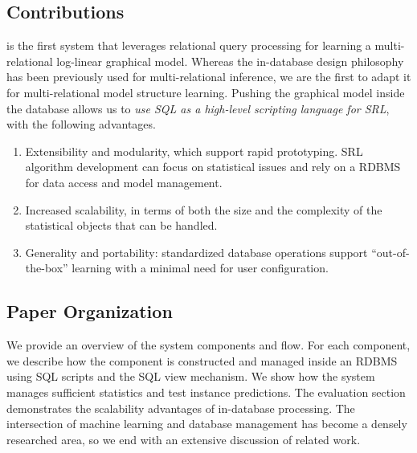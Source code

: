 \documentclass{IEEEtran}
\begin{document}
\subsection{Contributions}
\FB  is the first system that leverages relational query processing for learning a multi-relational log-linear graphical model. Whereas the in-database design philosophy has been previously used for multi-relational inference, we are the first to adapt it for multi-relational model structure learning. Pushing the graphical model inside the database 
allows us to {\em use SQL as a high-level scripting language for SRL}, with the following advantages.

\begin{enumerate}
\item Extensibility and modularity, which support rapid prototyping. SRL algorithm development can focus on statistical issues and rely on a RDBMS for data access and model management.
\item Increased scalability, in terms of both the size and the complexity of the statistical objects that can be handled.
\item Generality and portability: standardized database operations support ``out-of-the-box'' learning with a minimal need for user configuration.
\end{enumerate}
\subsection{Paper Organization}
We provide an overview of the system components and flow. For each component, we describe how the component is constructed and managed inside an RDBMS using SQL scripts and the SQL view mechanism. We show how the system manages sufficient statistics and test instance predictions. The evaluation section demonstrates the scalability advantages of in-database processing. The intersection of machine learning and database management has become a densely researched area, so we end with an extensive discussion of related work. 
\end{document}

